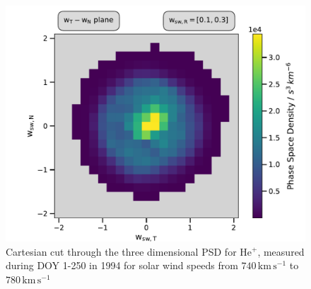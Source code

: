 \begin{figure}[h]
	\includegraphics[width=.85\textwidth]{Figures/cart_long_ps.pdf}
	\centering
	\caption{Cartesian cut through the three dimensional PSD for $\mathrm{He^{+}}$, measured during DOY 1-250 in 1994 for solar wind speeds from $740 \, \mathrm{km\,s^{-1}}$ to $780 \, \mathrm{km\,s^{-1}}$}
	\label{fig:psd_lang}
\end{figure}
%
%
%
%
%
\clearpage
